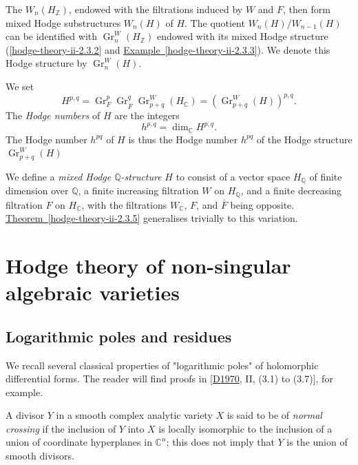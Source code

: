     The \(W_n(H_\mathbb {Z})\), endowed with the filtrations induced by \(W\) and \(F\), then form mixed Hodge substructures \(W_n(H)\) of \(H\).
    The quotient \(W_n(H)/W_{n-1}(H)\) can be identified with \(\operatorname {Gr}_n^W(H_\mathbb {Z})\) endowed with its mixed Hodge structure (\cref{hodge-theory-ii-2.3.2} and \hyperref[hodge-theory-ii-2.3.3]{Example~\ref*{hodge-theory-ii-2.3.3}}).
    We denote this Hodge structure by \(\operatorname {Gr}_n^W(H)\).\label{hodge-theory-ii-2.3.7}\par{}We set
    \[       H^{p,q}       = \operatorname {Gr}_F^p\operatorname {Gr}_{\overline {F}}^q\operatorname {Gr}_{p+q}^W(H_\mathbb {C})       = (\operatorname {Gr}_{p+q}^W(H))^{p,q}.     \]
    The \emph{Hodge numbers} of \(H\) are the integers
    \[       h^{p,q}       = \dim _\mathbb {C} H^{p,q}.     \]
    The Hodge number \(h^{pq}\) of \(H\) is thus the Hodge number \(h^{pq}\) of the Hodge structure \(\operatorname {Gr}_{p+q}^W(H)\)\label{hodge-theory-ii-2.3.8}\par{}We define a \emph{mixed Hodge \(\mathbb {Q}\)-structure} \(H\) to consist of a vector space \(H_\mathbb {Q}\) of finite dimension over \(\mathbb {Q}\), a finite increasing filtration \(W\) on \(H_\mathbb {Q}\), and a finite decreasing filtration \(F\) on \(H_\mathbb {C}\), with the filtrations \(W_\mathbb {C}\), \(F\), and \(\overline {F}\) being opposite.
    \hyperref[hodge-theory-ii-2.3.5]{Theorem~\ref*{hodge-theory-ii-2.3.5}} generalises trivially to this variation.\chapter{Hodge theory of non-singular algebraic varieties}\thispagestyle{fancy}\label{hodge-theory-ii-3}\section{Logarithmic poles and residues}\label{hodge-theory-ii-3.1}\label{hodge-theory-ii-3.1.1}\par{}We recall several classical properties of "logarithmic poles" of holomorphic differential forms.
    The reader will find proofs in [\hyperref[D1970]{D1970}, II, (3.1) to (3.7)], for example.\label{hodge-theory-ii-3.1.2}\par{}A divisor \(Y\) in a smooth complex analytic variety \(X\) is said to be of \emph{normal crossing} if the inclusion of \(Y\) into \(X\) is locally isomorphic to the inclusion of a union of coordinate hyperplanes in \(\mathbb {C}^n\);
    this does not imply that \(Y\) is the union of smooth divisors.
